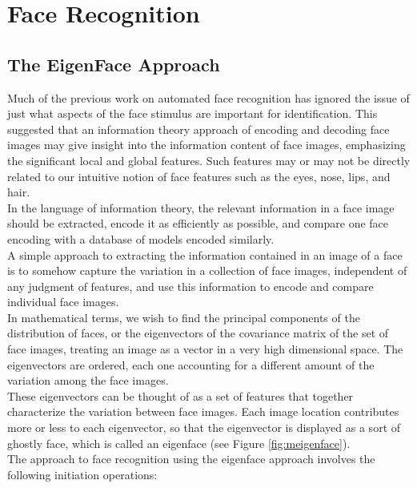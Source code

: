 
\section{Face Recognition}

\subsection{The EigenFace Approach}
Much of the previous work on automated face recognition has ignored the issue of
just what aspects of the face stimulus are important for identification.
This suggested that an information theory approach of encoding and decoding
face images may give insight into the information content of face images,
emphasizing the significant local and global features. Such features may or may not
be directly related to our intuitive notion of face features such as the eyes, nose,
lips, and hair. \\
In the language of information theory, the relevant information in a face image
should be extracted, encode it as efficiently as possible, and compare one face
encoding with a database of models encoded similarly. \\
A simple approach to extracting the information contained in an image of a face
is to somehow capture the variation in a collection of face images, independent
of any judgment of features, and use this information to encode and compare
individual face images. \\
In mathematical terms, we wish to find the principal components of the distribution of
faces, or the eigenvectors of the covariance matrix of the set of face images,
treating an image as a vector in a very high dimensional space. The eigenvectors
are ordered, each one accounting for a different amount of the variation among the face
images. \\
These eigenvectors can be thought of as a set of features that together characterize
the variation between face images. Each image location contributes more or less
to each eigenvector, so that the eigenvector is displayed as a sort of ghostly
face, which is called an eigenface (see Figure \ref{fig:meigenface}). \\
The approach to face recognition using the eigenface approach involves the
following initiation operations: \\
